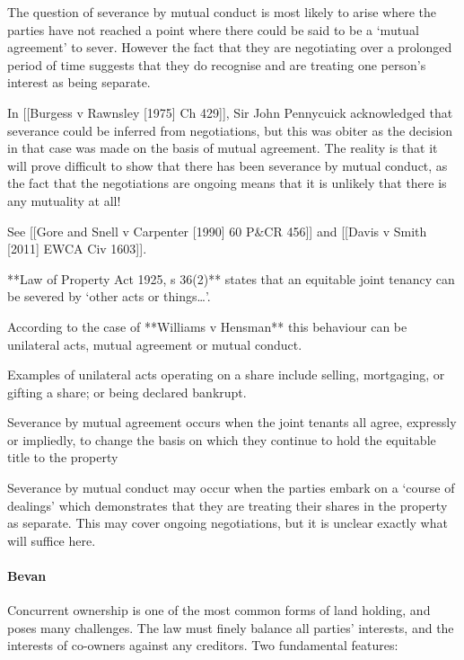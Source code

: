 \documentclass[
]{article}
\newenvironment{Shaded}{}{}
\newcommand{\NormalTok}[1]{#1}
\begin{document}
The question of severance by mutual conduct is most likely to arise
where the parties have not reached a point where there could be said to
be a `mutual agreement' to sever. However the fact that they are
negotiating over a prolonged period of time suggests that they do
recognise and are treating one person's interest as being separate.

In {[}{[}Burgess v Rawnsley {[}1975{]} Ch 429{]}{]}, Sir John Pennycuick
acknowledged that severance could be inferred from negotiations, but
this was obiter as the decision in that case was made on the basis of
mutual agreement. The reality is that it will prove difficult to show
that there has been severance by mutual conduct, as the fact that the
negotiations are ongoing means that it is unlikely that there is any
mutuality at all!

See {[}{[}Gore and Snell v Carpenter {[}1990{]} 60 P\&CR 456{]}{]} and
{[}{[}Davis v Smith {[}2011{]} EWCA Civ 1603{]}{]}.

\begin{Shaded}
\begin{Highlighting}[]
\NormalTok{**Law of Property Act 1925, s 36(2)** states that an equitable joint tenancy can be severed by ‘other acts or things…’.}

\NormalTok{According to the case of **Williams v Hensman** this behaviour can be unilateral acts, mutual agreement or mutual conduct.}

\NormalTok{Examples of unilateral acts operating on a share include selling, mortgaging, or gifting a share; or being declared bankrupt.}

\NormalTok{Severance by mutual agreement occurs when the joint tenants all agree, expressly or impliedly, to change the basis on which they continue to hold the equitable title to the property}

\NormalTok{Severance by mutual conduct may occur when the parties embark on a ‘course of dealings’ which demonstrates that they are treating their shares in the property as separate. This may cover ongoing negotiations, but it is unclear exactly what will suffice here.}
\end{Highlighting}
\end{Shaded}

\hypertarget{bevan-1}{%
\paragraph{Bevan}\label{bevan-1}}

Concurrent ownership is one of the most common forms of land holding,
and poses many challenges. The law must finely balance all parties'
interests, and the interests of co-owners against any creditors. Two
fundamental features:
\end{document}
